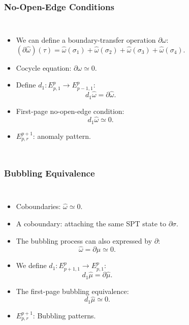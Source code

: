 \documentclass[xcolor=table, 10pt, aspectratio=43]{beamer}
\begin{document}
\begin{frame}
	\frametitle{No-Open-Edge Conditions}
	\begin{columns}
		\begin{itemize}
			\item We can define a boundary-transfer operation $\partial\omega$:
			\[(\partial\hat\omega)(\tau)=\hat\omega(\sigma_1)
			+\hat\omega(\sigma_2)+\hat\omega(\sigma_3)+\hat\omega(\sigma_4).\]
			\item Cocycle equation: $\partial\omega\simeq0.$
			\item Define $d_1: E^p_{p,1}\rightarrow E^p_{p-1,1}$:
			\[d_1\hat\omega = \partial\hat\omega.\]
			\item First-page no-open-edge condition:
			\[d_1\hat\omega \simeq 0.\]
			\item $E^{p+1}_{p,r}$: anomaly pattern.
		\end{itemize}
	\end{columns}
\end{frame}

\begin{frame}
	\frametitle{Bubbling Equivalence}
\begin{columns}
\begin{itemize}
\item Coboundaries: $\hat\omega\simeq0$.
\item A coboundary: attaching the same SPT state to  $\partial \sigma$.
\item The bubbling process can also expressed by $\partial$:
\[\hat\omega = \partial\hat\mu\simeq0.\]
\item We define $d_1:E^p_{p+1, 1}\rightarrow E^p_{p,1}$:
\[d_1\hat\mu = \partial\hat\mu.\]
\item The first-page bubbling equivalence:
\[d_1\hat\mu\simeq0.\]
\item $E^{p+1}_{p,r}$: Bubbling patterns.
\end{itemize}
\begin{animateinline}{5}
\end{animateinline}
\end{columns}
\end{frame}
\end{document}
